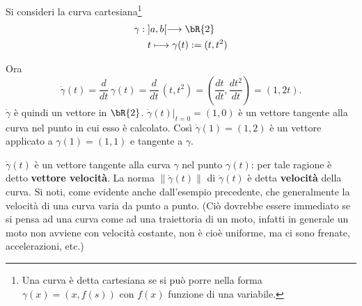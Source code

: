 \begin{example}
  Si consideri la curva cartesiana\footnote{Una curva \`e detta cartesiana se si 
pu\`o porre 
  nella forma $\gamma(x) = (x,f(s))$ con $f(x)$ funzione di una variabile.}
  \[\begin{aligned}
    \gamma: & \; ]a,b[ \longrightarrow \bR{2}\\
    &\;  t\longmapsto \gamma(t):= (t,t^2)
  \end{aligned}\]
\begin{figure}[h!]
\begin{center}
{\small
{}
}
\end{center}
\end{figure}
  Ora  
  \[
    \dot\gamma(t) = \frac{d}{dt}\, \gamma(t) = \frac{d}{dt}\, (t,t^2) = 
\left(\frac{dt}{dt},\frac{dt^2}{dt}\right)
    = \left(1,2t\right). 
  \]
  $\dot\gamma$ \`e quindi un vettore in $\bR{2}$. $\dot \gamma(t)|_{t=0} = 
(1,0)$ \`e un vettore
  tangente alla curva nel punto in cui esso \`e calcolato. Cos\`{i} 
$\dot\gamma(1) = (1,2)$ 
  \`e un vettore applicato a $\gamma(1) = (1,1)$ e tangente a $\gamma$.   
\end{example}

$\dot\gamma(t)$ \`e un vettore tangente alla curva $\gamma$ nel punto 
$\gamma(t)$: 
per tale ragione \`e detto {\bf vettore velocit\`a}. La norma 
$\|\dot\gamma(t)\|$ di 
$\dot\gamma(t)$ \`e  detta {\bf velocit\`a} della curva. Si noti, come evidente 
anche 
dall'esempio precedente, che generalmente la velocit\`a di una curva varia da 
punto a punto.
(Ci\`o dovrebbe essere immediato se si pensa ad una curva come ad una 
traiettoria
di un moto, infatti in generale un moto non avviene con velocit\`a costante, non 
\`e 
cio\`e uniforme, ma ci sono frenate, accelerazioni, etc.)

